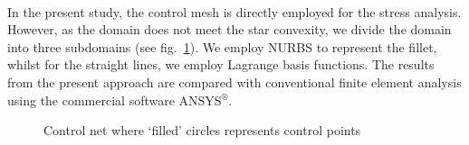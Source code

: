 \paragraph{}
In the present study, the control mesh is directly employed for the stress analysis.
However, as the domain does not meet the star convexity, we divide the domain into three subdomains (see fig.~\ref{iso_fig:l_with_fillet_mesh}).
We employ NURBS to represent the fillet, whilst for the straight lines, we employ Lagrange basis functions.
The results from the present approach are compared with conventional finite element analysis using the commercial
    software ANSYS$^\circledR$.
    \begin{figure}[h!]
        \centering
        \caption{Control net where `filled' circles represents control points}
        \label{iso_fig:l_with_fillet_mesh}
    \end{figure}

